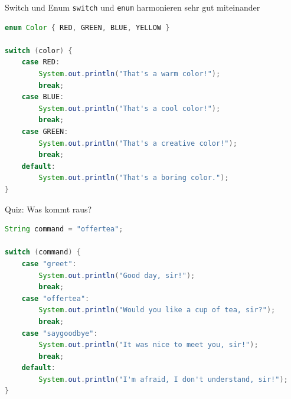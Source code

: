 \documentclass[18pt]{beamer}
\begin{document}
\begin{frame}[fragile]{Switch und Enum}
    \texttt{switch} und \texttt{enum} harmonieren sehr gut miteinander
    \begin{exampleblock}{}
        \begin{lstlisting}[language=Java,basicstyle=\scriptsize]
enum Color { RED, GREEN, BLUE, YELLOW }

switch (color) {
    case RED:
        System.out.println("That's a warm color!");
        break;
    case BLUE:
        System.out.println("That's a cool color!");
        break;
    case GREEN:
        System.out.println("That's a creative color!");
        break;
    default:
        System.out.println("That's a boring color.");
}
        \end{lstlisting}
    \end{exampleblock}
\end{frame}

\begin{frame}[fragile]{Quiz: Was kommt raus?}
    \begin{exampleblock}{}
        \begin{lstlisting}[language=Java,basicstyle=\scriptsize]
String command = "offertea";

switch (command) {
    case "greet":
        System.out.println("Good day, sir!");
        break;
    case "offertea":
        System.out.println("Would you like a cup of tea, sir?");
        break;
    case "saygoodbye":
        System.out.println("It was nice to meet you, sir!");
        break;
    default:
        System.out.println("I'm afraid, I don't understand, sir!");
}
        \end{lstlisting}
    \end{exampleblock}
\end{frame}
\end{document}
